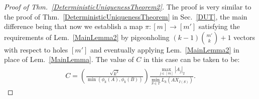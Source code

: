 \documentclass[journal, twocolumn]{IEEEtran}
\newtheorem{theorem}{Theorem}
\newtheorem{lemma}{Lemma}
\begin{document}
\begin{proof}[Proof of Thm.~\ref{DeterministicUniquenessTheorem2}]
The proof is very similar to the proof of Thm.~\ref{DeterministicUniquenessTheorem} in Sec.~\ref{DUT}, the main difference being that now we establish a map $\pi: [m] \to [m']$ satisfying the requirements of Lem.~\ref{MainLemma2} by pigeonholing $(k-1){m' \choose k} + 1$ vectors with respect to holes $[m']$ and eventually applying Lem.~\ref{MainLemma2} in place of Lem.~\ref{MainLemma}. The value of $C$ in this case can be taken to be:
\begin{align}\label{Cdef2}
C= \left( \frac{ \sqrt{k^3}}{ \min(\phi_k(A), \phi_k(B)) } \right) \frac{\max_{j \in [m]} |A_j|_2}{\min_{S \in T} L_k(AX_{I(S)})}.
\end{align}
\end{proof}






\end{document}
